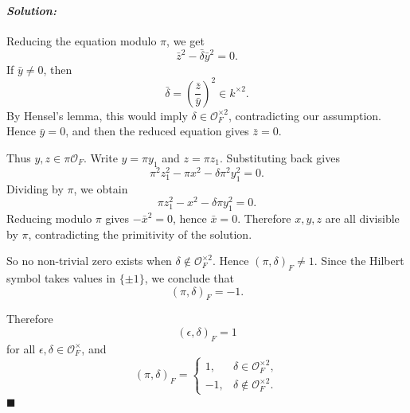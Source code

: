 \documentclass[12pt, a4paper]{article}
\newenvironment{solution}
  {\paragraph{\textit{Solution:}}\par\medskip}
  {\hfill$\blacksquare$\vspace{0.1cm}}
\begin{document}
\begin{solution}
Reducing the equation modulo \(\pi\), we get
\[
\bar z^2-\bar\delta \bar y^2=0.
\]
If \(\bar y\neq 0\), then
\[
\bar\delta=\left(\frac{\bar z}{\bar y}\right)^2\in k^{\times 2}.
\]
By Hensel's lemma, this would imply
\(\delta\in\mathcal O_F^{\times 2}\), contradicting our assumption. Hence
\(\bar y=0\), and then the reduced equation gives \(\bar z=0\).

Thus \(y,z\in\pi\mathcal O_F\). Write \(y=\pi y_1\) and \(z=\pi z_1\). Substituting
back gives
\[
\pi^2 z_1^2-\pi x^2-\delta\pi^2 y_1^2=0.
\]
Dividing by \(\pi\), we obtain
\[
\pi z_1^2-x^2-\delta\pi y_1^2=0.
\]
Reducing modulo \(\pi\) gives \(-\bar x^2=0\), hence \(\bar x=0\). Therefore
\(x,y,z\) are all divisible by \(\pi\), contradicting the primitivity of the
solution.

So no non-trivial zero exists when
\(\delta\notin\mathcal O_F^{\times 2}\). Hence \((\pi,\delta)_F\neq 1\). Since
the Hilbert symbol takes values in \(\{\pm 1\}\), we conclude that
\[
(\pi,\delta)_F=-1.
\]

Therefore
\[
(\epsilon,\delta)_F=1
\]
for all \(\epsilon,\delta\in\mathcal O_F^\times\), and
\[
(\pi,\delta)_F=
\begin{cases}
1,& \delta\in\mathcal O_F^{\times 2},\\
-1,& \delta\notin\mathcal O_F^{\times 2}.
\end{cases}
\]
\end{solution}
\end{document}
